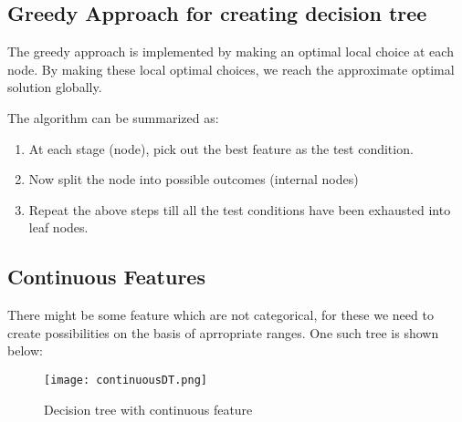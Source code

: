\vspace{5mm}
\subsection{Greedy Approach for creating decision tree}
    The greedy approach is implemented by making an optimal local choice at each node. By making these local optimal choices, we reach the approximate optimal solution globally.

    The algorithm can be summarized as: 
    \begin{enumerate}
        \item At each stage (node), pick out the best feature as the test condition.
        \item Now split the node into possible outcomes (internal nodes)
        \item Repeat the above steps till all the test conditions have been exhausted into leaf nodes.
    \end{enumerate}

\vspace{5mm}
\subsection{Continuous Features}
    There might be some feature which are not categorical, for these we need to create possibilities on the basis of aprropriate ranges. One such tree is shown below:
    \begin{figure}[h]
        \centering
        \texttt{[image: continuousDT.png]}
        \caption{Decision tree with continuous feature}
    \end{figure}


